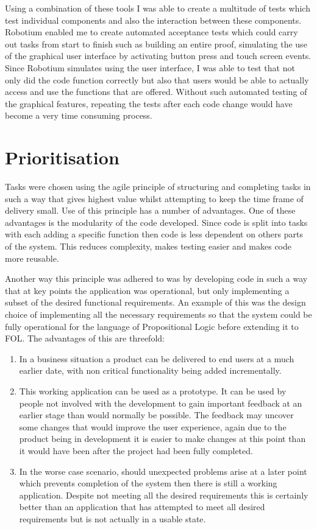 Using a combination of these tools I was able to create a multitude of tests which test individual components and also the interaction between these components. Robotium enabled me to create automated acceptance tests which could carry out tasks from start to finish such as building an entire proof, simulating the use of the graphical user interface by activating button press and touch screen events. Since Robotium simulates using the user interface, I was able to test that not only did the code function correctly but also that users would be able to actually access and use the functions that are offered. Without such automated testing of the graphical features, repeating the tests after each code change would have become a very time consuming process. 





\section{Prioritisation}

Tasks were chosen using the agile principle of structuring and completing tasks in such a way that gives highest value whilst attempting to keep the time frame of delivery small. Use of this principle has a number of advantages. One of these advantages is the modularity of the code developed. Since code is split into tasks with each adding a specific function then code is less dependent on others parts of the system. This reduces complexity, makes testing easier and makes code more reusable. 

Another way this principle was adhered to was by developing code in such a way that at key points the application was operational, but only implementing a subset of the desired functional requirements. An example of this was the design choice of implementing all the necessary requirements so that the system could be fully operational for the language of Propositional Logic before extending it to FOL. The advantages of this are threefold:
\begin{enumerate}
\item In a business situation a product can be delivered to end users at a much earlier date, with non critical functionality being added incrementally.
\item This working application can be used as a prototype. It can be used by people not involved with the development to gain important feedback at an earlier stage than would normally be possible. The feedback may uncover some changes that would improve the user experience, again due to the product being in development it is easier to make changes at this point than it would have been after the project had been fully completed.
\item In the worse case scenario, should unexpected problems arise at a later point which prevents completion of the system then there is still a working application. Despite not meeting all the desired requirements this is certainly better than an application that has attempted to meet all desired requirements but is not actually in a usable state.
\end{enumerate}



